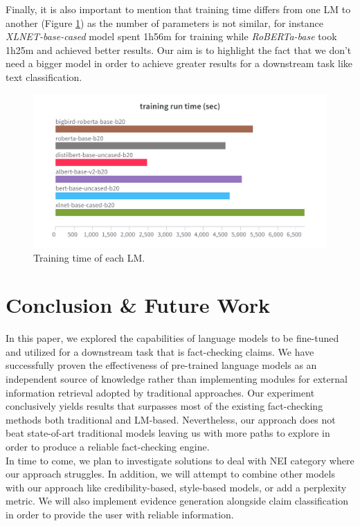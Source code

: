 \documentclass[conference]{IEEEtran}
\begin{document}
Finally, it is also important to mention that training time differs from one LM to another (Figure \ref{fig:train_time}) as the number of parameters is not similar, for instance \textit{XLNET-base-cased} model spent 1h56m for training while \textit{RoBERTa-base} took 1h25m and achieved better results. Our aim is to highlight the fact that we don't need a bigger model in order to achieve greater results for a downstream task like text classification.

\begin{figure}[htp]
    \centering
    \includegraphics[scale=0.13]{train_time.png}
    \caption[Comparison]{Training time of each LM.}
    \label{fig:train_time}
\end{figure}

\section{Conclusion \& Future Work}
In this paper, we explored the capabilities of language models to be fine-tuned and utilized for a downstream task that is fact-checking claims. We have successfully proven the effectiveness of pre-trained language models as an independent source of knowledge rather than implementing modules for external information retrieval adopted by traditional approaches. Our experiment conclusively yields results that surpasses most of the existing fact-checking methods both traditional and LM-based. Nevertheless, our approach does not beat state-of-art traditional models leaving us with more paths to explore in order to produce a reliable fact-checking engine.\\

In time to come, we plan to investigate solutions to deal with NEI category where our approach struggles. In addition, we will attempt to combine other models with our approach like credibility-based, style-based models, or add a perplexity metric. We will also implement evidence generation alongside claim classification in order to provide the user with reliable information.  
\end{document}
